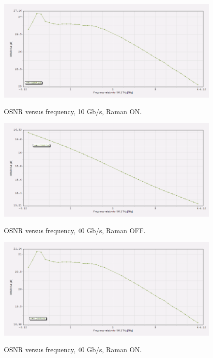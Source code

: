 \documentclass[a4paper,10pt]{report}
\begin{document}
\begin{figure}[!ht]
   \centering
   \includegraphics[width=12cm]{q1a_10_ramanon.png}\\
   \caption{OSNR versus frequency, 10 Gb/s, Raman ON.}
   \label{q1a_10_ramanon}
\end{figure}

\begin{figure}[!ht]
   \centering
   \includegraphics[width=12cm]{q1a_40.png}\\
   \caption{OSNR versus frequency, 40 Gb/s, Raman OFF.}
   \label{q1a_40}
\end{figure}
   
\begin{figure}[!ht]
   \centering
   \includegraphics[width=12cm]{q1a_40_ramanon.png}\\
   \caption{OSNR versus frequency, 40 Gb/s, Raman ON.}
   \label{q1a_40_ramanon}
\end{figure}
\end{document}
